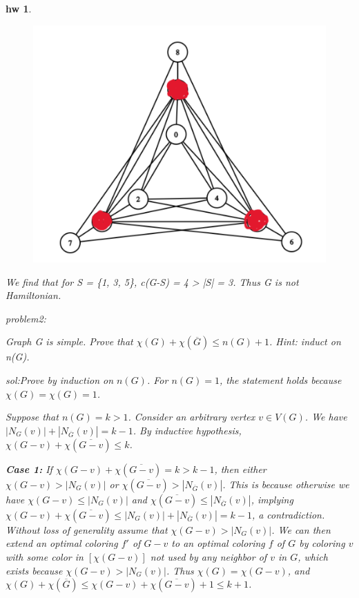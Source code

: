 \documentclass[twocolumn]{article}
\newtheorem{hw}{hw}
\begin{document}
\begin{CJK*}{UTF8}{bkai}
\begin{hw}
\begin{figure}[H]
    \centering
    \includegraphics[scale = 0.1]{hw.png}
\end{figure}

We find that for S = \{1, 3, 5\}, c(G-S) = 4 > |S| = 3. Thus G is not Hamiltonian.

problem2:

Graph G is simple. Prove that $\chi(G) + \chi(\overline{G}) \leq n(G) + 1$. Hint: induct on n(G).

sol:Prove by induction on $n(G)$. For $n(G) = 1$, the statement holds because $\chi(G) = \chi(G) = 1$.

Suppose that $n(G) = k > 1$. Consider an arbitrary vertex $v \in V(G)$. We have $|N_G(v)| + |N_{\overline{G}}(v)| = k - 1$. By inductive hypothesis, $\chi(G - v) + \chi(\overline{G - v}) \leq k$.

\textbf{Case 1:} If $\chi(G - v) + \chi(\overline{G - v}) = k > k - 1$, then either $\chi(G - v) > |N_G(v)|$ or $\chi(\overline{G - v}) > |N_{\overline{G}}(v)|$. This is because otherwise we have $\chi(G - v) \leq |N_G(v)|$ and $\chi(\overline{G - v}) \leq |N_{\overline{G}}(v)|$, implying $\chi(G - v) + \chi(\overline{G - v}) \leq |N_G(v)| + |N_{\overline{G}}(v)| = k - 1$, a contradiction. Without loss of generality assume that $\chi(G - v) > |N_G(v)|$. We can then extend an optimal coloring $f'$ of $G - v$ to an optimal coloring $f$ of $G$ by coloring $v$ with some color in $[\chi(G - v)]$ not used by any neighbor of $v$ in $G$, which exists because $\chi(G - v) > |N_G(v)|$. Thus $\chi(G) = \chi(G - v)$, and $\chi(G) + \chi(\overline{G}) \leq \chi(G - v) + \chi(\overline{G - v}) + 1 \leq k + 1$.


\end{hw}
\end{CJK*}
\end{document}
